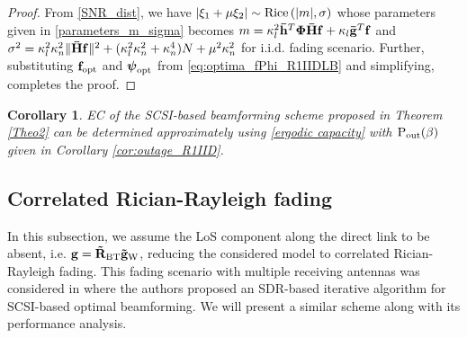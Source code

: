 \documentclass[journal,draftclsnofoot,onecolumn,12pt]{IEEEtran}
\newtheorem{corollary}{Corollary}[theorem]
\begin{document}
\begin{proof}
From \eqref{SNR_dist}, we have $ |\xi_1 + \mu\xi_2|\sim{\rm Rice}\left(|m|,\sigma\right)$ whose parameters given in \eqref{parameters_m_sigma} becomes  $m=\kappa_l^2\mathbf{\Bar{h}}^T\mathbf{\Phi \bar{H}f}+ \kappa_l\mathbf{\Bar{g}}^T\mathbf{f}$ and $\sigma^2 = \kappa_l^2\kappa_n^2\|\mathbf{\Bar{H}f}\|^2 +  (\kappa_l^2\kappa_n^2+\kappa_n^4)N + \mu^2\kappa_n^2$ for {\rm i.i.d}. fading scenario. Further, substituting $\mathbf{f}_{\rm opt}$ and $\boldsymbol{\psi}_{\rm opt}$ from \eqref{eq:optima_fPhi_R1IIDLB} and simplifying, completes the proof.
\end{proof}
\vspace{-0.3cm}
\begin{corollary}
    EC of the SCSI-based beamforming scheme proposed in  Theorem \ref{Theo2} can be determined approximately using \eqref{ergodic capacity} with ${\rm P_{out}}(\beta)$ given in Corollary \ref{cor:outage_R1IID}.
\end{corollary}
\vspace{-0.3cm}
\vspace{-0.3cm}
\subsection{Correlated Rician-Rayleigh fading}
\label{R2}
In this subsection, we assume the LoS component along the direct link to be absent, i.e. $\mathbf{g} = \mathbf{\Tilde{R}}_{\rm BT} \mathbf{\Tilde{g}}_{\rm W}$, reducing the considered model to correlated Rician-Rayleigh fading. This fading scenario with multiple receiving antennas was considered in \cite{WangJinghe_CorrelatedFading_2021} where the authors  proposed an SDR-based iterative algorithm for SCSI-based optimal beamforming. We will present a similar scheme along with its performance analysis. 
\end{document}
